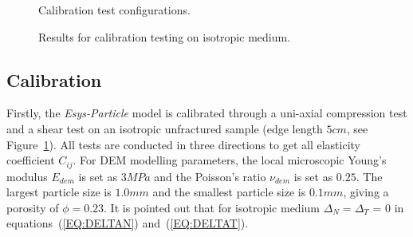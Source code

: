 \documentclass[review,authoryear]{elsarticle}
\newcommand{\esysparticle}{\textit{Esys-Particle }}
\begin{document}
\begin{figure}[t]
\centering
\caption{Calibration test configurations.}\label{FIG:GEOMETRY}
\end{figure}

\begin{figure}
\centering
\caption{Results for calibration testing on isotropic medium.}\label{FIG:FRAC0}
\end{figure}


\subsection{Calibration}\label{SEC:CALI}
Firstly, the \esysparticle model is calibrated through a uni-axial compression test and a shear test on an isotropic unfractured sample (edge length $5cm$, see Figure~\ref{FIG:GEOMETRY}). 
All tests are conducted in three directions to get all elasticity coefficient $C_{ij}$. 
For DEM modelling parameters, the local microscopic Young's modulus $E_{dem}$ is set as $3 MPa$ and the Poisson's ratio $\nu_{dem}$ is set as $0.25$. 
The largest particle size is $1.0 mm$ and the smallest particle size is $0.1 mm$, giving a porosity of $\phi = 0.23$. It is pointed out that 
for isotropic medium $\Delta_N = \Delta_T$ = 0 in equations~(\ref{EQ:DELTAN}) and~(\ref{EQ:DELTAT}).
\end{document}
